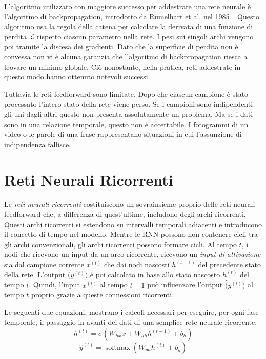 L'algoritmo utilizzato con maggiore successo per addestrare una rete neurale \`e l'algoritmo di backpropagation, introdotto da Rumelhart et al. nel 1985~\cite{Rumelhart:1985}.
Questo algoritmo usa la regola della catena per calcolare la derivata di una funzione di perdita $\mathcal{L}$ rispetto ciascun parametro nella rete.
I pesi sui singoli archi vengono poi tramite la discesa dei gradienti.
Dato che la superficie di perdita non \`e convessa non vi \`e alcuna garanzia che l'algoritmo di backpropagation riesca a trovare un minimo globale.
Ci\`o nonostante, nella pratica, reti addestrate in questo modo hanno ottenuto notevoli successi.

Tuttavia le reti feedforward sono limitate.
Dopo che ciascun campione \`e stato processato l'intero stato della rete viene perso.
Se i campioni sono indipendenti gli uni dagli altri questo non presenta assolutamente un problema.
Ma se i dati sono in una relazione temporale, questo non \`e accettabile.
I fotogrammi di un video o le parole di una frase rappresentano situazioni in cui l'assunzione di indipendenza fallisce.

\section{Reti Neurali Ricorrenti}
Le \emph{reti neurali ricorrenti} costituiscono un sovrainsieme proprio delle reti neurali feedforward che, a differenza di quest'ultime, includono degli archi ricorrenti.
Questi archi ricorrenti si estendono su intervalli temporali adiacenti e introducono il concetto di tempo nel modello.
Mentre le RNN possono non contenere cicli tra gli archi convenzionali, gli archi ricorrenti possono formare cicli.
Al tempo $t$, i nodi che ricevono un input da un arco ricorrente, ricevono un \emph{input di attivazione} sia dal campione corrente $x^({t})$ che dai nodi nascosti $h^{(t-1)}$ del precedente stato della rete.
L'output $\hat(y^{(t)})$ \`e poi calcolato in base allo stato nascosto $h^{(t)}$ del tempo $t$.
Quindi, l'input $x^({t})$ al tempo $t-1$ pu\`o influenzare l'output $\hat(y^{(t)})$ al tempo $t$ proprio grazie a queste connessioni ricorrenti.

Le seguenti due equazioni, mostrano i calcoli necessari per eseguire, per ogni fase temporale, il passaggio in avanti dei dati di una semplice rete neurale ricorrente:
\begin{equation}
  h^{(t)} = \sigma(W_{hx}x + W_{hh}h^{(t-1)} + b_h)
\end{equation}
\begin{equation}
  \hat{y}^{(t)} = \operatorname{softmax}(W_{yh}h^{(t)} + b_y)
\end{equation}

